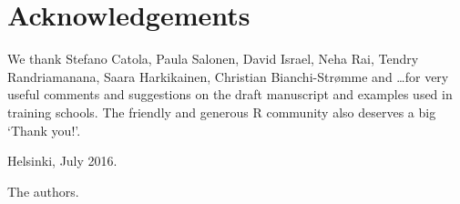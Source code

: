 \section{Acknowledgements}

We thank Stefano Catola, Paula Salonen, David Israel, Neha Rai, Tendry Randriamanana, Saara Harkikainen, Christian Bianchi-Str{\o}mme and \ldots for very useful comments and suggestions on the draft manuscript and examples used in training schools. The friendly and generous R community also deserves a big `Thank you!'.  

Helsinki, July 2016.

The authors.